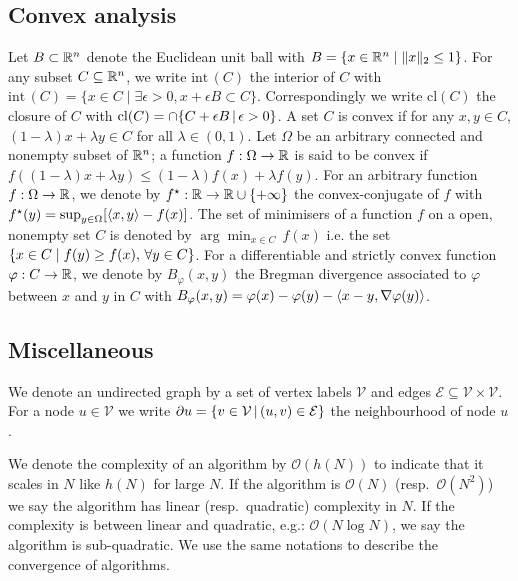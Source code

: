 \subsection*{Convex analysis}
Let $B\subset\mathbb R^{n}$ denote the Euclidean unit ball with $B=\{x\in\mathbb R^{n}\mid \|x\|_{2}\le 1\}$. For any subset $C\subseteq\mathbb R^{n}$, we write $\mathrm{int}\,(C)$ the interior of $C$ with $\mathrm{int}\,(C)=\{x\in C \mid \exists \epsilon>0, x+\epsilon B \subset C\}$. Correspondingly we write $\mathrm{cl}(C)$ the closure of $C$ with $\mathrm{cl}(C) = \cap\{C+\epsilon B\,|\, \epsilon>0\}$. A set $C$ is convex if for any $x,y\in C$, $(1-\lambda)x+\lambda y\in C$ for all $\lambda\in(0,1)$. Let $\Omega$ be an arbitrary connected and nonempty subset of $\mathbb R^{n}$; a function $f:\Omega\to\mathbb R$ is said to be convex if $f((1-\lambda)x+\lambda y)\le (1-\lambda)f(x)+\lambda f(y)$. For an arbitrary function $f:\Omega\to\mathbb R$, we denote by $f^{\star}:\mathbb R\to \mathbb R\cup\{+\infty\}$ the convex-conjugate of $f$ with $f^{\star}(y)=\sup_{y\in \Omega}[\left\langle x,y \right\rangle-f(x)]$. The set of minimisers of a function $f$ on a open, nonempty set $C$ is denoted by $\arg\min_{x\in C}\,f(x)$ i.e. the set $\left\{x\in C\mid f(y)\ge f(x), \,\forall y\in C\right\}$. For a differentiable and strictly convex function $\varphi:C\to\mathbb R$, we denote by $B_\varphi(x,y)$ the Bregman divergence associated to $\varphi$ between $x$ and $y$ in $C$ with $B_\varphi(x,y)=\varphi(x)-\varphi(y)-\left\langle x-y,\nabla \varphi(y) \right\rangle$.  

\subsection*{Miscellaneous}
We denote an undirected graph by a set of vertex labels $\mathcal V$ and edges $\mathcal E\subseteq \mathcal V\times\mathcal V$. For a node $u\in\mathcal V$ we write $\partial u = \{v \in\mathcal V \,|\, (u,v)\in \mathcal E\}$ the neighbourhood of node $u$.

We denote the complexity of an algorithm by $\mathcal O(h(N))$ to indicate that it scales in $N$ like $h(N)$ for large $N$. If the algorithm is $\mathcal O(N)$ (resp.\ $\mathcal O(N^{2})$) we say the algorithm has linear (resp.\ quadratic) complexity in $N$. If the complexity is between linear and quadratic, e.g.: $\mathcal O(N\log N)$, we say the algorithm is sub-quadratic. We use the same notations to describe the convergence of algorithms.


